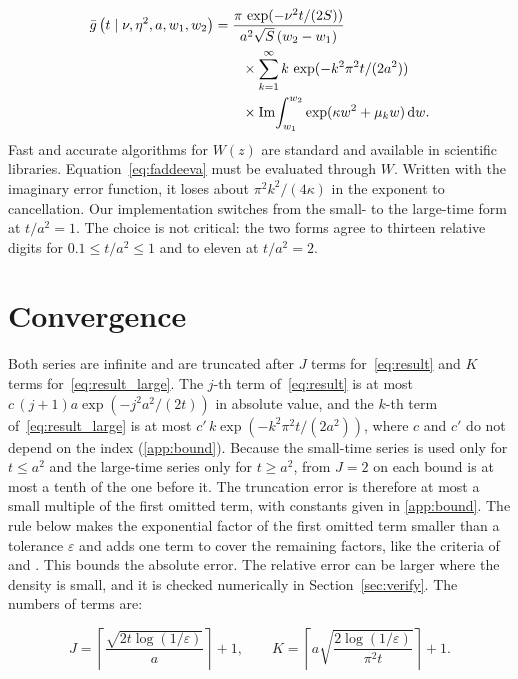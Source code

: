\documentclass[final,5p,times,twocolumn,authoryear]{elsarticle}
\newcommand{\dd}{\,\mathrm{d}}
\newcommand{\gbar}{\bar{g}}
\begin{document}
\begin{align}
\gbar\left(t \mid \nu, \eta^2, a, w_1, w_2\right)
 &= \frac{\pi\, \exp(-\nu^2 t/(2S))}{a^2\sqrt{S}\,(w_2 - w_1)} \notag\\
 &\qquad\times \sum_{k=1}^{\infty} k\, \exp(-k^2\pi^2 t/(2a^2)) \notag\\
 &\qquad\times \operatorname{Im}\!\int_{w_1}^{w_2} \exp(\kappa w^2 + \mu_k w)\dd w .
\label{eq:result_large}
\end{align}
Fast and accurate algorithms for $W(z)$ are standard \citep{ZaghloulAli2011} and available in scientific libraries.  Equation~\eqref{eq:faddeeva} must be evaluated through $W$. Written with the imaginary error function, it loses about $\pi^2 k^2/(4\kappa)$ in the exponent to cancellation. Our implementation switches from the small- to the large-time form at $t/a^2 = 1$. The choice is not critical: the two forms agree to thirteen relative digits for $0.1 \le t/a^2 \le 1$ and to eleven at $t/a^2 = 2$.

\section{Convergence}
\label{sec:conv}

\begin{sloppypar}
Both series are infinite and are truncated after $J$ terms for~\eqref{eq:result} and $K$ terms for~\eqref{eq:result_large}. The $j$-th term of~\eqref{eq:result} is at most $c\,(j+1)a\exp(-j^2 a^2/(2t))$ in absolute value, and the $k$-th term of~\eqref{eq:result_large} is at most $c'\,k\exp(-k^2\pi^2 t/(2a^2))$, where $c$ and $c'$ do not depend on the index (\ref{app:bound}). Because the small-time series is used only for $t \le a^2$ and the large-time series only for $t \ge a^2$, from $J = 2$ on each bound is at most a tenth of the one before it. The truncation error is therefore at most a small multiple of the first omitted term, with constants given in \ref{app:bound}. The rule below makes the exponential factor of the first omitted term smaller than a tolerance $\varepsilon$ and adds one term to cover the remaining factors, like the criteria of \citet{NavarroFuss2009} and \citet{Gondan2014}. This bounds the absolute error. The relative error can be larger where the density is small, and it is checked numerically in Section~\ref{sec:verify}. The numbers of terms are:
\end{sloppypar}
\begin{equation}
J = \left\lceil \frac{\sqrt{2 t \log(1/\varepsilon)}}{a} \right\rceil + 1,
\qquad
K = \left\lceil a\sqrt{\frac{2\log(1/\varepsilon)}{\pi^2 t}} \right\rceil + 1 .
\label{eq:JK}
\end{equation}
\end{document}
